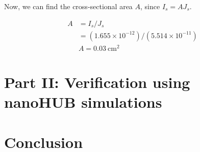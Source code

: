 \documentclass{IEEEtran}
\begin{document}
Now, we can find the cross-sectional area \(A\), since \(I_s = AJ_s\).

\begin{align*}
    A &= I_s / J_s \\ 
      &= (1.655\times10^{-12}) / (5.514\times10^{-11}) \\
      & \boxed{A = 0.03 ~ \text{cm}^2}
\end{align*}

\section*{Part II: Verification using nanoHUB simulations}


\section*{Conclusion}



\end{document}
